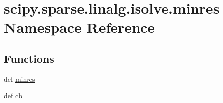 \hypertarget{namespacescipy_1_1sparse_1_1linalg_1_1isolve_1_1minres}{}\section{scipy.\+sparse.\+linalg.\+isolve.\+minres Namespace Reference}
\label{namespacescipy_1_1sparse_1_1linalg_1_1isolve_1_1minres}
\subsection*{Functions}
\begin{DoxyCompactItemize}
\item 
def \hyperlink{namespacescipy_1_1sparse_1_1linalg_1_1isolve_1_1minres_adbbf23f2db0af0399bc0b2119eb2fb99}{minres}
\item 
def \hyperlink{namespacescipy_1_1sparse_1_1linalg_1_1isolve_1_1minres_a801d9f18c679bd8057d8d5eb189daa50}{cb}
\end{DoxyCompactItemize}
